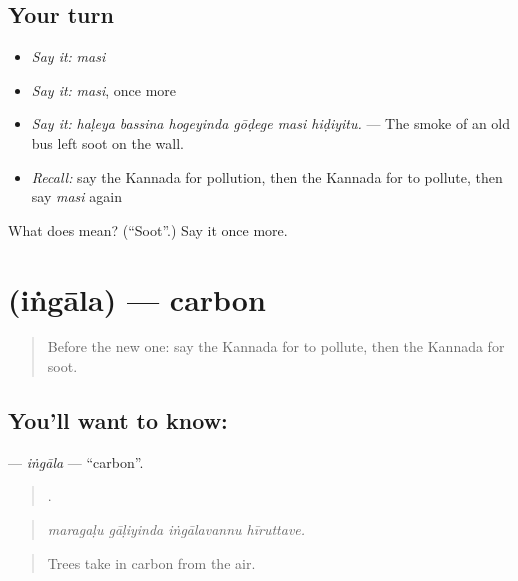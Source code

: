 \subsection*{Your turn}
\begin{itemize}
\raggedright
  \item \emph{Say it:} \emph{masi}
  \item \emph{Say it:} \emph{masi}, once more
  \item \emph{Say it:} \emph{haḷeya bassina hogeyinda gōḍege masi hiḍiyitu.} — The smoke of an old bus left soot on the wall.
  \item \emph{Recall:} say the Kannada for pollution, then the Kannada for to pollute, then say \emph{masi} again
\end{itemize}

\begin{tcolorbox}[breakable,colback=teal!4,colframe=teal!35!black,title={Before you move on}]
What does  mean? (\textquotedblleft{}Soot\textquotedblright{}.) Say it once more.
\end{tcolorbox}
\section[\texorpdfstring{\kn{ಇಂಗಾಲ} (iṅgāla)}{ಇಂಗಾಲ (iṅgāla)}]{ (iṅgāla) — carbon}

\label{lesson:KA-C473-ingala}



\begin{quote}
Before the new one: say the Kannada for to pollute, then the Kannada for soot.
\end{quote}

\subsection*{You'll want to know: }
\textbf{} — \emph{iṅgāla} — \textquotedblleft{}carbon\textquotedblright{}.

\begin{quote}
   .
\end{quote}

\begin{quote}
\emph{maragaḷu gāḷiyinda iṅgālavannu hīruttave.}
\end{quote}

\begin{quote}
Trees take in carbon from the air.
\end{quote}


